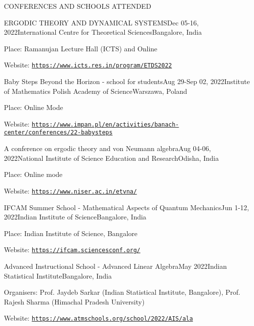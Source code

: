 \documentclass{resume} %
\newcommand{\weblink}[1]{\texttt{\href{#1}{#1}}}
\begin{document}
\begin{rSection}{CONFERENCES AND SCHOOLS ATTENDED}
	
	\begin{rSubsection}{ERGODIC THEORY AND DYNAMICAL SYSTEMS}{Dec 05-16, 2022}{International Centre for Theoretical Sciences}{Bangalore, India}
		\item Place: Ramanujan Lecture Hall (ICTS) and Online
		\item Website: \weblink{https://www.icts.res.in/program/ETDS2022}
	\end{rSubsection}
	
	\begin{rSubsection}{Baby Steps Beyond the Horizon - school for students}{Aug 29-Sep 02, 2022}{Institute of Mathematics Polish Academy of Science}{Warszawa, Poland}
		\item Place: Online Mode
		\item Website: \weblink{https://www.impan.pl/en/activities/banach-center/conferences/22-babysteps}
	\end{rSubsection}
	
	\begin{rSubsection}{A conference on ergodic theory and von Neumann algebra}{Aug 04-06, 2022}{National Institute of Science Education and Research}{Odisha, India}
		\item Place: Online mode
		\item Website: \weblink{https://www.niser.ac.in/etvna/}
	\end{rSubsection}

	\begin{rSubsection}{IFCAM Summer School - Mathematical Aspects of Quantum Mechanics}{Jun 1-12, 2022}{Indian Institute of Science}{Bangalore, India}
		\item Place: Indian Institute of Science, Bangalore
		\item Website: \weblink{https://ifcam.sciencesconf.org/}
	\end{rSubsection}
	
	\begin{rSubsection}{Advanced Instructional School - Advanced Linear Algebra}{May 2022}{Indian Statistical Institute}{Bangalore, India}
		\item Organisers: Prof. Jaydeb Sarkar (Indian Statistical Institute, Bangalore), Prof. Rajesh Sharma (Himachal Pradesh University)
		
		\item Website: \weblink{https://www.atmschools.org/school/2022/AIS/ala}
	\end{rSubsection}


\end{rSection}
\end{document}
